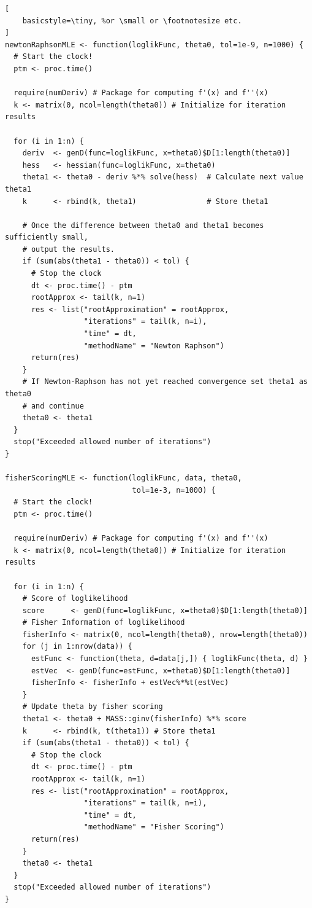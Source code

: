 \begin{appendices}
\begin{lstlisting}[
	basicstyle=\tiny, %or \small or \footnotesize etc.
]
newtonRaphsonMLE <- function(loglikFunc, theta0, tol=1e-9, n=1000) {
  # Start the clock!
  ptm <- proc.time()
  
  require(numDeriv) # Package for computing f'(x) and f''(x)
  k <- matrix(0, ncol=length(theta0)) # Initialize for iteration results
  
  for (i in 1:n) {
    deriv  <- genD(func=loglikFunc, x=theta0)$D[1:length(theta0)] 
    hess   <- hessian(func=loglikFunc, x=theta0)                  
    theta1 <- theta0 - deriv %*% solve(hess)  # Calculate next value theta1 
    k      <- rbind(k, theta1)                # Store theta1

    # Once the difference between theta0 and theta1 becomes sufficiently small, 
    # output the results.
    if (sum(abs(theta1 - theta0)) < tol) {
      # Stop the clock
      dt <- proc.time() - ptm
      rootApprox <- tail(k, n=1)
      res <- list("rootApproximation" = rootApprox, 
                  "iterations" = tail(k, n=i), 
                  "time" = dt,
                  "methodName" = "Newton Raphson")
      return(res)
    }
    # If Newton-Raphson has not yet reached convergence set theta1 as theta0 
    # and continue
    theta0 <- theta1
  }
  stop("Exceeded allowed number of iterations")
}

fisherScoringMLE <- function(loglikFunc, data, theta0, 
                             tol=1e-3, n=1000) {
  # Start the clock!
  ptm <- proc.time()
  
  require(numDeriv) # Package for computing f'(x) and f''(x)
  k <- matrix(0, ncol=length(theta0)) # Initialize for iteration results
  
  for (i in 1:n) {
    # Score of loglikelihood 
    score      <- genD(func=loglikFunc, x=theta0)$D[1:length(theta0)] 
    # Fisher Information of loglikelihood
    fisherInfo <- matrix(0, ncol=length(theta0), nrow=length(theta0))
    for (j in 1:nrow(data)) {
      estFunc <- function(theta, d=data[j,]) { loglikFunc(theta, d) }
      estVec  <- genD(func=estFunc, x=theta0)$D[1:length(theta0)]
      fisherInfo <- fisherInfo + estVec%*%t(estVec)
    }
    # Update theta by fisher scoring
    theta1 <- theta0 + MASS::ginv(fisherInfo) %*% score
    k      <- rbind(k, t(theta1)) # Store theta1
    if (sum(abs(theta1 - theta0)) < tol) {
      # Stop the clock
      dt <- proc.time() - ptm
      rootApprox <- tail(k, n=1)
      res <- list("rootApproximation" = rootApprox, 
                  "iterations" = tail(k, n=i), 
                  "time" = dt,
                  "methodName" = "Fisher Scoring")
      return(res)
    }
    theta0 <- theta1
  }
  stop("Exceeded allowed number of iterations")
}


\end{lstlisting}
\end{appendices}

